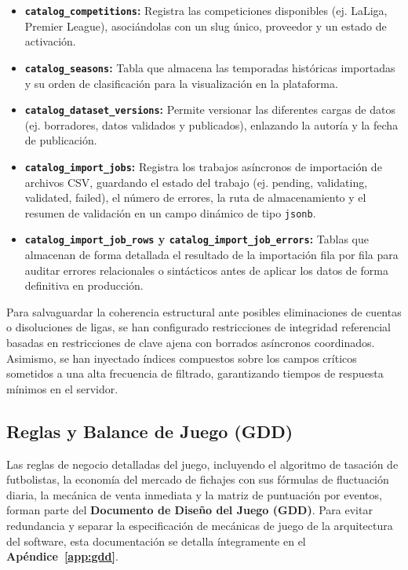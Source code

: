 \begin{itemize}
    \item \textbf{\texttt{catalog\_competitions}:} Registra las competiciones disponibles (ej. LaLiga, Premier League), asociándolas con un slug único, proveedor y un estado de activación.
    \item \textbf{\texttt{catalog\_seasons}:} Tabla que almacena las temporadas históricas importadas y su orden de clasificación para la visualización en la plataforma.
    \item \textbf{\texttt{catalog\_dataset\_versions}:} Permite versionar las diferentes cargas de datos (ej. borradores, datos validados y publicados), enlazando la autoría y la fecha de publicación.
    \item \textbf{\texttt{catalog\_import\_jobs}:} Registra los trabajos asíncronos de importación de archivos CSV, guardando el estado del trabajo (ej. pending, validating, validated, failed), el número de errores, la ruta de almacenamiento y el resumen de validación en un campo dinámico de tipo \texttt{jsonb}.
    \item \textbf{\texttt{catalog\_import\_job\_rows} y \texttt{catalog\_import\_job\_errors}:} Tablas que almacenan de forma detallada el resultado de la importación fila por fila para auditar errores relacionales o sintácticos antes de aplicar los datos de forma definitiva en producción.
\end{itemize}

Para salvaguardar la coherencia estructural ante posibles eliminaciones de cuentas o disoluciones de ligas, se han configurado restricciones de integridad referencial basadas en restricciones de clave ajena con borrados asíncronos coordinados. Asimismo, se han inyectado índices compuestos sobre los campos críticos sometidos a una alta frecuencia de filtrado, garantizando tiempos de respuesta mínimos en el servidor.


\subsection{Reglas y Balance de Juego (GDD)}
Las reglas de negocio detalladas del juego, incluyendo el algoritmo de tasación de futbolistas, la economía del mercado de fichajes con sus fórmulas de fluctuación diaria, la mecánica de venta inmediata y la matriz de puntuación por eventos, forman parte del \textbf{Documento de Diseño del Juego (GDD)}. Para evitar redundancia y separar la especificación de mecánicas de juego de la arquitectura del software, esta documentación se detalla íntegramente en el \textbf{Apéndice~\ref{app:gdd}}.

